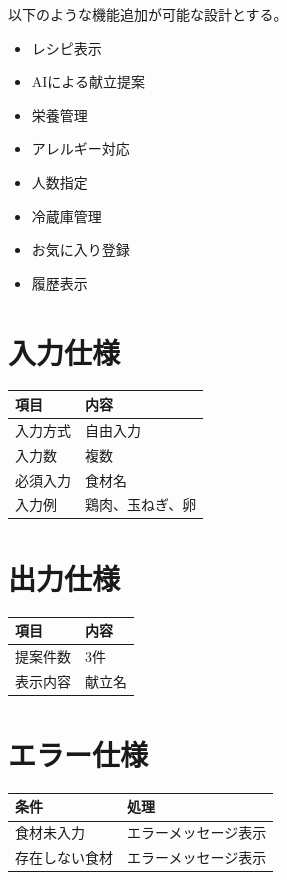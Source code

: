 \documentclass[a4paper,12pt]{jarticle}
\begin{document}
以下のような機能追加が可能な設計とする。

\begin{itemize}
    \item レシピ表示
    \item AIによる献立提案
    \item 栄養管理
    \item アレルギー対応
    \item 人数指定
    \item 冷蔵庫管理
    \item お気に入り登録
    \item 履歴表示
\end{itemize}

\section{入力仕様}

\begin{longtable}{|p{4cm}|p{9cm}|}
\hline
項目 & 内容\\
\hline
入力方式 & 自由入力\\
\hline
入力数 & 複数\\
\hline
必須入力 & 食材名\\
\hline
入力例 & 鶏肉、玉ねぎ、卵\\
\hline
\end{longtable}

\section{出力仕様}

\begin{longtable}{|p{4cm}|p{9cm}|}
\hline
項目 & 内容\\
\hline
提案件数 & 3件\\
\hline
表示内容 & 献立名\\
\hline
\end{longtable}

\section{エラー仕様}

\begin{longtable}{|p{6cm}|p{7cm}|}
\hline
条件 & 処理\\
\hline
食材未入力 & エラーメッセージ表示\\
\hline
存在しない食材 & エラーメッセージ表示\\
\hline
\end{longtable}
\end{document}
